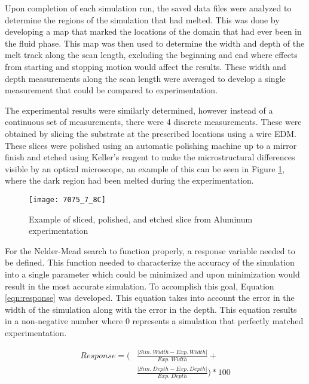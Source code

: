 \label{sim_analysis}

Upon completion of each simulation run, the saved data files were analyzed to determine the regions of the simulation that had melted.  This was done by developing a map that marked the locations of the domain that had ever been in the fluid phase.  This map was then used to determine the width and depth of the melt track along the scan length, excluding the beginning and end where effects from starting and stopping motion would affect the results.  These width and depth measurements along the scan length were averaged to develop a single measurement that could be compared to experimentation.  

The experimental results were similarly determined, however instead of a continuous set of measurements, there were 4 discrete measurements.  These were obtained by slicing the substrate at the prescribed locations using a wire \ac{EDM}.  These slices were polished using an automatic polishing machine up to a mirror finish and etched using Keller's reagent to make the microstructural differences visible by an optical microscope, an example of this can be seen in Figure \ref{fig:7075_7_8C}, where the dark region had been melted during the experimentation.
\begin{figure}[!htb]
	\centering
	\texttt{[image: 7075\_7\_8C]}
	\caption{Example of sliced, polished, and etched slice from Aluminum experimentation}
	\label{fig:7075_7_8C}
\end{figure}

For the Nelder-Mead search to function properly, a response variable needed to be defined.  This function needed to characterize the accuracy of the simulation into a single parameter which could be minimized and upon minimization would result in the most accurate simulation.  To accomplish this goal, Equation \ref{eqn:response} was developed.  This equation takes into account the error in the width of the simulation along with the error in the depth.  This equation results in a non-negative number where 0 represents a simulation that perfectly matched experimentation.

\begin{equation}\label{eqn:response}
	\begin{split}
		Response =  \Biggl ( &\frac{\lvert Sim.\ Width - Exp.\ Width \rvert}{Exp.\ Width} + \\ 
		&\frac{\lvert Sim.\ Depth - Exp.\ Depth \rvert}{Exp.\ Depth} \Biggr ) * 100
	\end{split}
\end{equation}